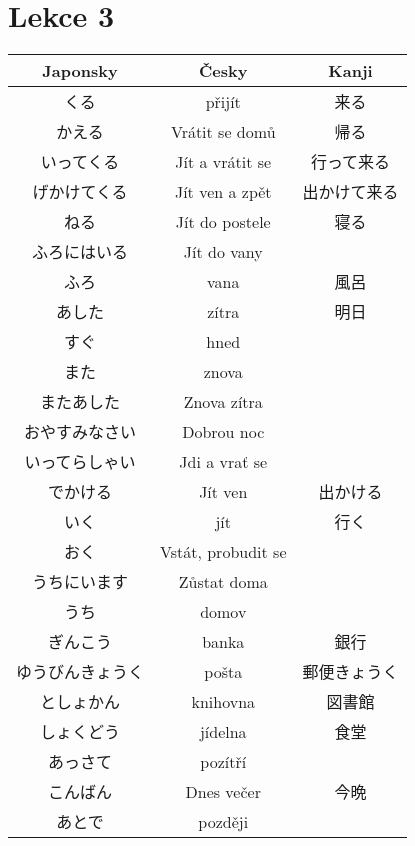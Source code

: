  \section{Lekce 3}
\begin{table}[H]
\centering
\begin{tabular}{ccc}
\hline
Japonsky & Česky                                        & Kanji \\
\hline
くる       & přijít             & 来る     \\
かえる      & Vrátit se domů     & 帰る     \\
いってくる    & Jít a vrátit se    & 行って来る  \\
げかけてくる   & Jít ven a zpět     & 出かけて来る \\
ねる       & Jít do postele     & 寝る     \\
ふろにはいる   & Jít do vany        &        \\
ふろ       & vana               & 風呂     \\
あした      & zítra              & 明日     \\
すぐ       & hned               &        \\
また       & znova              &        \\
またあした    & Znova zítra        &        \\
おやすみなさい  & Dobrou noc         &        \\
いってらしゃい  & Jdi a vrať se      &        \\
でかける     & Jít ven            & 出かける   \\
いく       & jít                & 行く     \\
おく       & Vstát, probudit se &        \\
うちにいます   & Zůstat doma        &        \\
うち       & domov              &        \\
ぎんこう     & banka              & 銀行     \\
ゆうびんきょうく & pošta              & 郵便きょうく \\
としょかん    & knihovna           & 図書館    \\
しょくどう    & jídelna            & 食堂     \\
あっさて     & pozítří            &        \\
こんばん     & Dnes večer         & 今晩     \\
あとで      & později            &       \\
\hline
\end{tabular}
\end{table}
